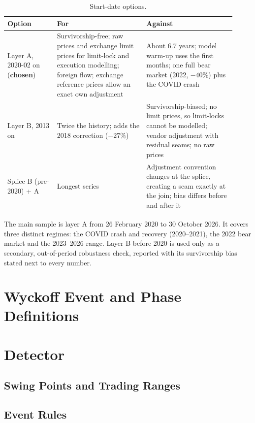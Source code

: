 \begin{table}[ht]
  \centering
  \caption{Start-date options.}
  \label{tab:data-period}
  \begin{tabular}{p{0.2\linewidth}p{0.36\linewidth}p{0.36\linewidth}}
    \toprule
    Option & For & Against \\
    \midrule
    Layer A, 2020-02 on (\textbf{chosen})
      & Survivorship-free; raw prices and exchange limit prices for limit-lock and execution
        modelling; foreign flow; exchange reference prices allow an exact own adjustment
      & About 6.7 years; model warm-up uses the first months; one full bear market (2022,
        $-40\%$) plus the COVID crash \\
    Layer B, 2013 on
      & Twice the history; adds the 2018 correction ($-27\%$)
      & Survivorship-biased; no limit prices, so limit-locks cannot be modelled; vendor
        adjustment with residual seams; no raw prices \\
    Splice B (pre-2020) + A
      & Longest series
      & Adjustment convention changes at the splice, creating a seam exactly at the join;
        bias differs before and after it \\
    \bottomrule
  \end{tabular}
\end{table}

The main sample is layer A from 26 February 2020 to 30 October 2026. It covers three distinct
regimes: the COVID crash and recovery (2020--2021), the 2022 bear market and the 2023--2026
range. Layer B before 2020 is used only as a secondary, out-of-period robustness check, reported
with its survivorship bias stated next to every number.

\section{Wyckoff Event and Phase Definitions}

\section{Detector}
\subsection{Swing Points and Trading Ranges}
\subsection{Event Rules}

